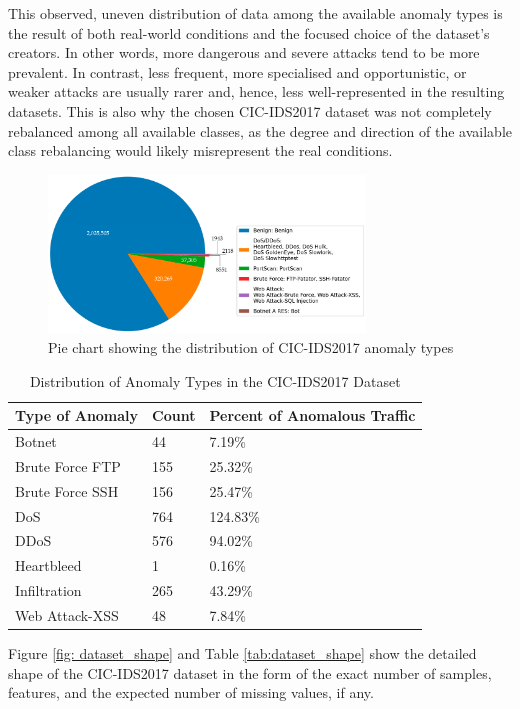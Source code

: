 This observed, uneven distribution of data among the available anomaly types is the result of both real-world conditions and the focused choice of the dataset's creators. In other words, more dangerous and severe attacks tend to be more prevalent. In contrast, less frequent, more specialised and opportunistic, or weaker attacks are usually rarer and, hence, less well-represented in the resulting datasets. This is also why the chosen CIC-IDS2017 dataset was not completely rebalanced among all available classes, as the degree and direction of the available class rebalancing would likely misrepresent the real conditions.

\begin{figure}[H] 
\centering 
\includegraphics[width=0.75\textwidth]{assets/figures/class_distr.png} 
\caption{Pie chart showing the distribution of CIC-IDS2017 anomaly types}
\label{fig:class_distr} 
\end{figure} 
\parencite{s23218788}

\begin{table}[H] 
\centering 
\caption{Distribution of Anomaly Types in the CIC-IDS2017 Dataset}
\label{tab:class_distr} 
\begin{tabular}{lll} 
\toprule 
Type of Anomaly & Count & Percent of Anomalous Traffic \\
\midrule 
Botnet & 44 & 7.19\% \\ 
Brute Force FTP & 155 & 25.32\% \\ 
Brute Force SSH & 156 & 25.47\% \\ 
DoS & 764 & 124.83\% \\ 
DDoS & 576 & 94.02\% \\ 
Heartbleed & 1 & 0.16\% \\ 
Infiltration & 265 & 43.29\% \\ 
Web Attack-XSS & 48 & 7.84\% \\ 
\bottomrule 
\end{tabular} 
\end{table} 

Figure \ref{fig: dataset_shape} and Table \ref{tab:dataset_shape} show the detailed shape of the CIC-IDS2017 dataset in the form of the exact number of samples, features, and the expected number of missing values, if any.

